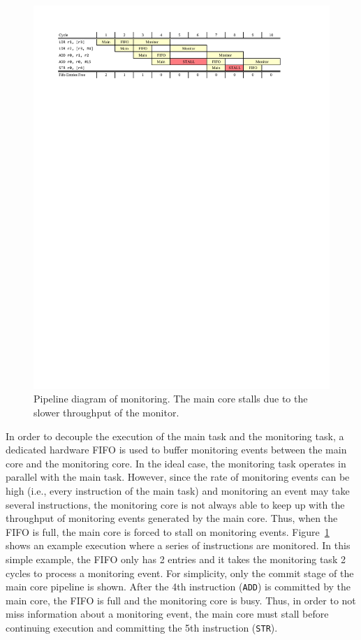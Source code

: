\begin{figure}
  \begin{center}
    \includegraphics[width=\linewidth]{monitoring_wcet/figs/pipeline.pdf}
    \caption{Pipeline diagram of monitoring. The main core stalls due to the
    slower throughput of the monitor.}
    \label{fig:monitoring_wcet.monitoring.pipeline}
  \end{center}
\end{figure}

In order to decouple the execution of the main task and the monitoring task, a
dedicated hardware FIFO is used to buffer monitoring events between the main
core and the monitoring core.  In the ideal case, the monitoring task operates
in parallel with the main task.  However, since the rate of monitoring events
can be high (i.e., every instruction of the main task) and monitoring an event
may take several instructions, the monitoring core is not always able to keep
up with the throughput of monitoring events generated by the main core.  Thus,
when the FIFO is full, the main core is forced to stall on monitoring events.
Figure~\ref{fig:monitoring_wcet.monitoring.pipeline} shows an example
execution where a series of instructions are monitored. In this simple example,
the FIFO only has 2 entries and it takes the monitoring task 2 cycles to
process a monitoring event. For simplicity, only the commit stage of the main
core pipeline is shown.  After the 4th instruction ({\tt ADD}) is committed by
the main core, the FIFO is full and the monitoring core is busy. Thus, in order
to not miss information about a monitoring event, the main core must stall
before continuing execution and committing the 5th instruction ({\tt STR}).

